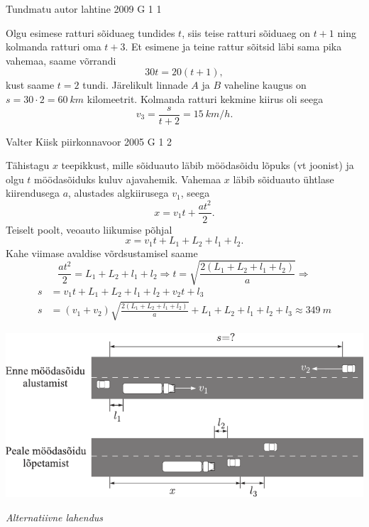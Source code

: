 \documentclass[11pt, twoside]{article}
\begin{document}
{%
{Tundmatu autor} %
{lahtine} %
{2009} %
{G 1} %
{1} %
{

\ifSolution
Olgu esimese ratturi sõiduaeg tundides $t$, siis teise ratturi sõiduaeg on $t + 1$ ning kolmanda ratturi oma $t+3$. Et esimene ja teine rattur sõitsid läbi sama pika vahemaa, saame võrrandi
\[
30 t=20(t+1),
\]
kust saame $t = \num{2}$ tundi. Järelikult linnade $A$ ja $B$ vaheline kaugus on $s = \num{30}·\num{2} = \SI{60}{km}$ kilomeetrit. Kolmanda ratturi kekmine kiirus oli seega
\[
v_{3}=\frac{s}{t+2}=\SI{15}{km/h}.
\]
\fi
}

{Valter Kiisk} %
{piirkonnavoor} %
{2005} %
{G 1} %
{2} %
{

\ifSolution
Tähistagu $x$ teepikkust, mille sõiduauto läbib möödasõidu lõpuks (vt joonist) ja olgu $t$ möödasõiduks kuluv ajavahemik. Vahemaa $x$ läbib sõiduauto ühtlase kiirendusega $a$, alustades algkiirusega $v_1$, seega
\[
x = v_1t + \frac{at^2}{2}. 
\]
Teiselt poolt, veoauto liikumise põhjal
\[
x = v_1t + L_1 + L_2 + l_1 + l_2.
\]
Kahe viimase avaldise võrdsustamisel saame
\[
\frac{a t^{2}}{2}=L_{1}+L_{2}+l_{1}+l_{2} \Rightarrow t=\sqrt{\frac{2\left(L_{1}+L_{2}+l_{1}+l_{2}\right)}{a}}\Rightarrow
\]
\[
\begin{aligned}
s &= v_1t + L_1 + L_2 + l_1 + l_2 + v_2t + l_3\\
s &= \left(v_{1}+v_{2}\right) \sqrt{\frac{2\left(L_{1}+L_{2}+l_{1}+l_{2}\right)}{a}}+L_{1}+L_{2}+l_{1}+l_{2}+l_{3} \approx \SI{349}{m}
\end{aligned}
\]

\begin{center}
	\includegraphics[width=\linewidth]{2005-v2g-01-lah}
\end{center}

\emph{Alternatiivne lahendus}

}}
\end{document}

